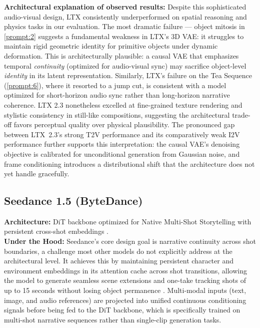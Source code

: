 \documentclass[sigconf]{acmart}
\begin{document}
\noindent\textbf{Architectural explanation of observed results:} Despite
this sophisticated audio-visual design, LTX consistently underperformed
on spatial reasoning and physics tasks in our evaluation. The most
dramatic failure — object mitosis in \ref{prompt:2} suggests a fundamental
weakness in LTX's 3D VAE: it struggles to maintain rigid geometric
identity for primitive objects under dynamic deformation. This is
architecturally plausible: a causal VAE that emphasizes temporal
\textit{continuity} (optimized for audio-visual sync) may sacrifice
object-level \textit{identity} in its latent representation. Similarly,
LTX's failure on the Tea Sequence (\ref{prompt:6}), where it
resorted to a jump cut,
is consistent with a model optimized for short-horizon audio sync rather
than long-horizon narrative coherence. LTX 2.3 nonetheless excelled at
fine-grained texture rendering and stylistic consistency in still-like
compositions, suggesting the architectural trade-off favors perceptual
quality over physical plausibility. The pronounced gap between LTX~2.3's strong T2V performance
and its comparatively weak I2V performance further supports
this interpretation: the causal VAE's denoising objective
is calibrated for unconditional generation from Gaussian noise,
and frame conditioning introduces a distributional shift
that the architecture does not yet handle gracefully.

\subsection{Seedance 1.5 (ByteDance)}
\textbf{Architecture:} DiT backbone optimized for Native Multi-Shot
Storytelling with persistent cross-shot embeddings
\cite{bytedance2025seedance}. \\

\noindent\textbf{Under the Hood:} Seedance's core design goal is
narrative continuity across shot boundaries, a challenge most other
models do not explicitly address at the architectural level. It
achieves this by maintaining persistent character and environment
embeddings in its attention cache across shot transitions, allowing
the model to generate seamless scene extensions and one-take tracking
shots of up to 15 seconds without losing object permanence
\cite{bytedance2025seedance}. Multi-modal inputs (text, image, and
audio references) are projected into unified continuous conditioning
signals before being fed to the DiT backbone, which is specifically
trained on multi-shot narrative sequences rather than
single-clip generation tasks.
\end{document}
